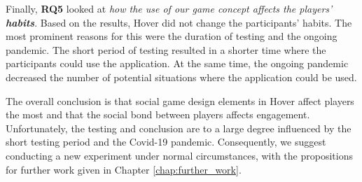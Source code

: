 Finally, \textbf{RQ5} looked at \textit{how the use of our game concept affects the players’ \textbf{habits}}. Based on the results, Hover did not change the participants’ habits. The most prominent reasons for this were the duration of testing and the ongoing pandemic. The short period of testing resulted in a shorter time where the participants could use the application. At the same time, the ongoing pandemic decreased the number of potential situations where the application could be used. 

The overall conclusion is that social game design elements in Hover affect players the most and that the social bond between players affects engagement. Unfortunately, the testing and conclusion are to a large degree influenced by the short testing period and the Covid-19 pandemic. Consequently, we suggest conducting a new experiment under normal circumstances, with the propositions for further work given in Chapter \ref{chap:further_work}.
